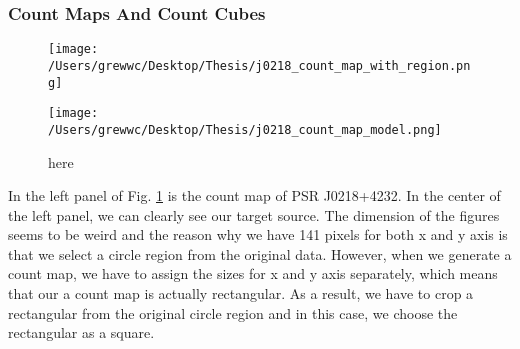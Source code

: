 \documentclass[12pt]{report}
\newcommand{\mycaption}[1]{\protect \caption{#1}}
\begin{document}
          \subsubsection{Count Maps And Count Cubes}
            \begin{figure}[!ht]  
              \begin{center}
              \begin{minipage}{0.45\textwidth}
                \begin{center} 
                    \texttt{[image: /Users/grewwc/Desktop/Thesis/j0218\_count\_map\_with\_region.png]}
                \end{center}
              \end{minipage}
              \begin{minipage}{0.45\textwidth}
                \begin{center} 
                    \texttt{[image: /Users/grewwc/Desktop/Thesis/j0218\_count\_map\_model.png]}
                \end{center}
              \end{minipage}
            \end{center}
            \begin{center}
              \caption{here}
            
            \label{fig: j0218_count_map_and_model}    
            \end{center} 
          \end{figure}
          In the left panel of Fig. \ref{fig: j0218_count_map_and_model} 
          is the count map of PSR J0218+4232.
          In the center of the left panel, 
          we can clearly see our target source. The dimension of the figures seems to be weird and 
          the reason why we have 141 pixels for both x and y axis is that we select a circle region from 
          the original data. However, when we generate a count map, we have to assign the sizes for x and y 
          axis separately, which means that our a count map is actually rectangular. As a result, we have to 
          crop a 
          rectangular from the original circle region and in this case, we choose the rectangular as a 
          square.  
          
\end{document}
